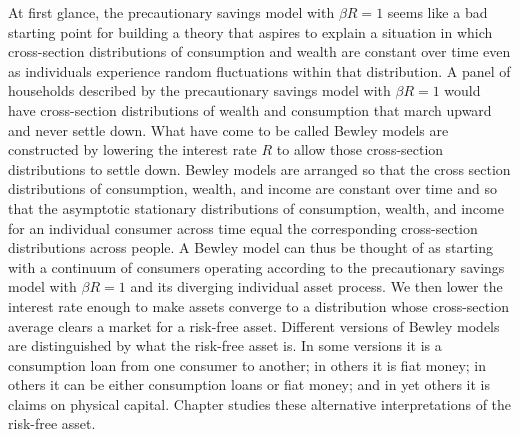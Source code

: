 At first glance,
the precautionary savings model with $\beta R=1$ seems like
a bad starting point
for building a theory
that aspires to explain a situation in which cross-section distributions
of consumption and wealth are constant over time even as individuals
experience random fluctuations within that distribution.
  A panel of households described by the precautionary savings model with
$\beta R =1$ would  have cross-section distributions  of wealth
and consumption that march upward and never settle down. What
have come to be called Bewley models  are
\newpage
\noindent  constructed by lowering
the interest rate $R$ to allow those cross-section distributions
to settle down.
 Bewley models are arranged so that the cross
section distributions of consumption, wealth, and income are
constant over time and so that  the asymptotic stationary
distributions of consumption, wealth, and income for an individual
consumer across time equal the corresponding cross-section
distributions across people.
 A Bewley model can thus
be thought of as starting with a continuum of consumers operating according to the
precautionary savings model with $\beta R=1$ and its diverging
individual asset process. We then lower the interest rate enough
to make assets converge to a distribution whose cross-section
average clears  a market for a risk-free asset.   Different
versions of Bewley  models are distinguished by what the risk-free
asset is. In some versions it is a consumption loan from one
consumer to another; in others it is fiat money; in others it can
be either consumption loans or fiat money; and in yet others it is
claims on physical capital.  Chapter  studies
these alternative interpretations of the risk-free asset.




